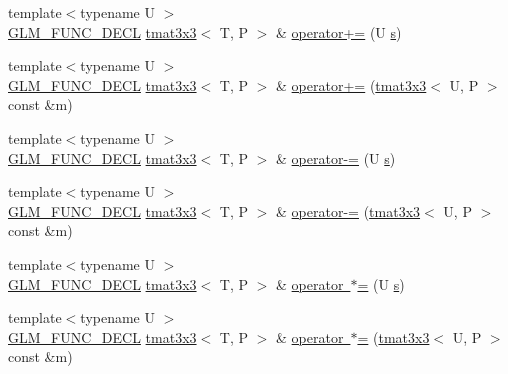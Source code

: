 \begin{DoxyCompactItemize}
\item 
{\footnotesize template$<$typename U $>$ }\\\mbox{\hyperlink{setup_8hpp_ab2d052de21a70539923e9bcbf6e83a51}{G\+L\+M\+\_\+\+F\+U\+N\+C\+\_\+\+D\+E\+CL}} \mbox{\hyperlink{structglm_1_1tmat3x3}{tmat3x3}}$<$ T, P $>$ \& \mbox{\hyperlink{structglm_1_1tmat3x3_a5bf05bc4653ffe3fccf1a04c04892f64}{operator+=}} (U \mbox{\hyperlink{glad_8h_af1b1d5edfea6a34daee7389b1b5810ad}{s}})
\item 
{\footnotesize template$<$typename U $>$ }\\\mbox{\hyperlink{setup_8hpp_ab2d052de21a70539923e9bcbf6e83a51}{G\+L\+M\+\_\+\+F\+U\+N\+C\+\_\+\+D\+E\+CL}} \mbox{\hyperlink{structglm_1_1tmat3x3}{tmat3x3}}$<$ T, P $>$ \& \mbox{\hyperlink{structglm_1_1tmat3x3_af0582e969c35858f4d11afc5327c3d4b}{operator+=}} (\mbox{\hyperlink{structglm_1_1tmat3x3}{tmat3x3}}$<$ U, P $>$ const \&m)
\item 
{\footnotesize template$<$typename U $>$ }\\\mbox{\hyperlink{setup_8hpp_ab2d052de21a70539923e9bcbf6e83a51}{G\+L\+M\+\_\+\+F\+U\+N\+C\+\_\+\+D\+E\+CL}} \mbox{\hyperlink{structglm_1_1tmat3x3}{tmat3x3}}$<$ T, P $>$ \& \mbox{\hyperlink{structglm_1_1tmat3x3_a50e65bdba7c569ff3fb987d0e9dedaa1}{operator-\/=}} (U \mbox{\hyperlink{glad_8h_af1b1d5edfea6a34daee7389b1b5810ad}{s}})
\item 
{\footnotesize template$<$typename U $>$ }\\\mbox{\hyperlink{setup_8hpp_ab2d052de21a70539923e9bcbf6e83a51}{G\+L\+M\+\_\+\+F\+U\+N\+C\+\_\+\+D\+E\+CL}} \mbox{\hyperlink{structglm_1_1tmat3x3}{tmat3x3}}$<$ T, P $>$ \& \mbox{\hyperlink{structglm_1_1tmat3x3_aab14e291cf845dc23bc569524ee341c8}{operator-\/=}} (\mbox{\hyperlink{structglm_1_1tmat3x3}{tmat3x3}}$<$ U, P $>$ const \&m)
\item 
{\footnotesize template$<$typename U $>$ }\\\mbox{\hyperlink{setup_8hpp_ab2d052de21a70539923e9bcbf6e83a51}{G\+L\+M\+\_\+\+F\+U\+N\+C\+\_\+\+D\+E\+CL}} \mbox{\hyperlink{structglm_1_1tmat3x3}{tmat3x3}}$<$ T, P $>$ \& \mbox{\hyperlink{structglm_1_1tmat3x3_a82628df54352bb7242856bfa3aca8b20}{operator $\ast$=}} (U \mbox{\hyperlink{glad_8h_af1b1d5edfea6a34daee7389b1b5810ad}{s}})
\item 
{\footnotesize template$<$typename U $>$ }\\\mbox{\hyperlink{setup_8hpp_ab2d052de21a70539923e9bcbf6e83a51}{G\+L\+M\+\_\+\+F\+U\+N\+C\+\_\+\+D\+E\+CL}} \mbox{\hyperlink{structglm_1_1tmat3x3}{tmat3x3}}$<$ T, P $>$ \& \mbox{\hyperlink{structglm_1_1tmat3x3_aff1d1624f10f8c4b96c4f44a42a9932d}{operator $\ast$=}} (\mbox{\hyperlink{structglm_1_1tmat3x3}{tmat3x3}}$<$ U, P $>$ const \&m)

\end{DoxyCompactItemize}
